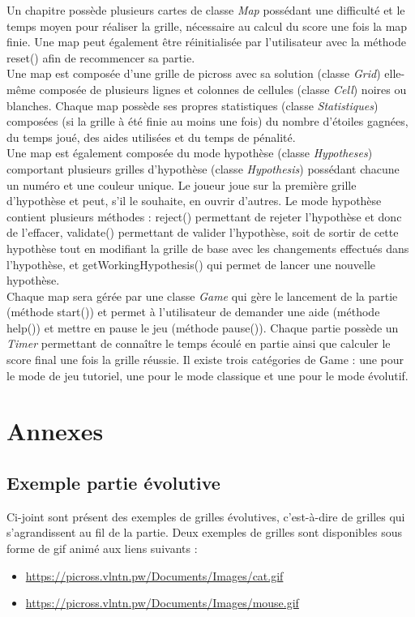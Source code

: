 \documentclass{report}
\begin{document}
	Un chapitre possède plusieurs cartes de classe \textit{Map} possédant une difficulté et le temps moyen pour réaliser la grille, nécessaire au calcul du score une fois la map finie. Une map peut également être réinitialisée par l’utilisateur avec la méthode reset() afin de recommencer sa partie.\\
	Une map est composée d’une grille de picross avec sa solution (classe \textit{Grid}) elle-même composée de plusieurs lignes et colonnes de cellules (classe \textit{Cell}) noires ou blanches. Chaque map possède ses propres statistiques (classe \textit{Statistiques})  composées (si la grille à été finie au moins une fois) du nombre d’étoiles gagnées, du temps joué, des aides utilisées et du temps de pénalité.\\
	Une map est également composée du mode hypothèse (classe \textit{Hypotheses}) comportant plusieurs grilles d’hypothèse (classe \textit{Hypothesis}) possédant chacune un numéro et une couleur unique. Le joueur joue sur la première grille d’hypothèse et peut, s’il le souhaite, en ouvrir d’autres. Le mode hypothèse contient plusieurs méthodes : reject() permettant de rejeter l’hypothèse et donc de l’effacer, validate() permettant de valider l’hypothèse, soit de sortir de cette hypothèse tout en modifiant la grille de base avec les changements effectués dans l’hypothèse, et getWorkingHypothesis() qui permet de lancer une nouvelle hypothèse.\\
	Chaque map sera gérée par une classe \textit{Game} qui gère le lancement de la partie (méthode start()) et  permet à l’utilisateur de demander une aide (méthode help()) et  mettre en pause le jeu (méthode pause()). Chaque partie possède un \textit{Timer} permettant de connaître le temps écoulé en partie ainsi que calculer le score final une fois la grille réussie. Il existe trois catégories de Game : une pour le mode de jeu tutoriel, une pour le mode classique et une pour le mode évolutif.

\chapter{Annexes}
\thispagestyle{empty}
\thispagestyle{plain}

		\section{Exemple partie évolutive}
	
		Ci-joint sont présent des exemples de grilles évolutives, c'est-à-dire de grilles qui s'agrandissent au fil de la partie.
		Deux exemples de grilles sont disponibles sous forme de gif animé aux liens suivants :
		 \begin{itemize}
    		 \item \url{https://picross.vlntn.pw/Documents/Images/cat.gif}
   	   	 \item \url{https://picross.vlntn.pw/Documents/Images/mouse.gif}
		 \end{itemize}
		
\end{document}
